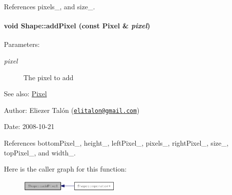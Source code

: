 References pixels\_\-, and size\_\-.\hypertarget{class_shape_f6114234203d9473f1fef9e6391f9243}{
\paragraph[addPixel]{\setlength{\rightskip}{0pt plus 5cm}void Shape::addPixel (const {\bf Pixel} \& {\em pixel})}\hfill}
\label{class_shape_f6114234203d9473f1fef9e6391f9243}


\begin{Desc}
\item[Parameters:]
\begin{description}
\item[{\em pixel}]The pixel to add\end{description}
\end{Desc}
\begin{Desc}
\item[See also:]\hyperlink{_shape_8hpp_535e59456e3e633842529cfa8ea103c4}{Pixel}\end{Desc}
\begin{Desc}
\item[Author:]Eliezer Talón (\href{mailto:elitalon@gmail.com}{\tt elitalon@gmail.com}) \end{Desc}
\begin{Desc}
\item[Date:]2008-10-21 \end{Desc}


References bottomPixel\_\-, height\_\-, leftPixel\_\-, pixels\_\-, rightPixel\_\-, size\_\-, topPixel\_\-, and width\_\-.

Here is the caller graph for this function:\nopagebreak
\begin{figure}[H]
\begin{center}
\leavevmode
\includegraphics[width=141pt]{class_shape_f6114234203d9473f1fef9e6391f9243_icgraph}
\end{center}
\end{figure}
